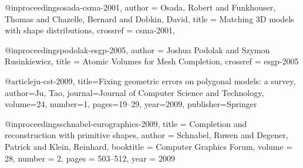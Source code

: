 @inproceedings{osada-csma-2001,
	author = {Osada, Robert and Funkhouser, Thomas and Chazelle, Bernard and Dobkin, David},
	title = {Matching {3D} models with shape distributions},
	crossref = {csma-2001},
}

@inproceedings{podolak-esgp-2005,
	author = {Joshua Podolak and Szymon Rusinkiewicz},
	title = {Atomic Volumes for Mesh Completion},
	crossref = {esgp-2005}
}

 
@article{ju-cst-2009,
	title={Fixing geometric errors on polygonal models: a survey},
	author={Ju, Tao},
	journal={Journal of Computer Science and Technology},
	volume={24},
	number={1},
	pages={19--29},
	year={2009},
	publisher={Springer}
}
 
 @inproceedings{schnabel-eurographics-2009,
	title = {Completion and reconstruction with primitive shapes},
	author = {Schnabel, Ruwen and Degener, Patrick and Klein, Reinhard},
	booktitle = {Computer Graphics Forum},
	volume = {28},
	number = {2},
	pages = {503--512},
	year = {2009}
}